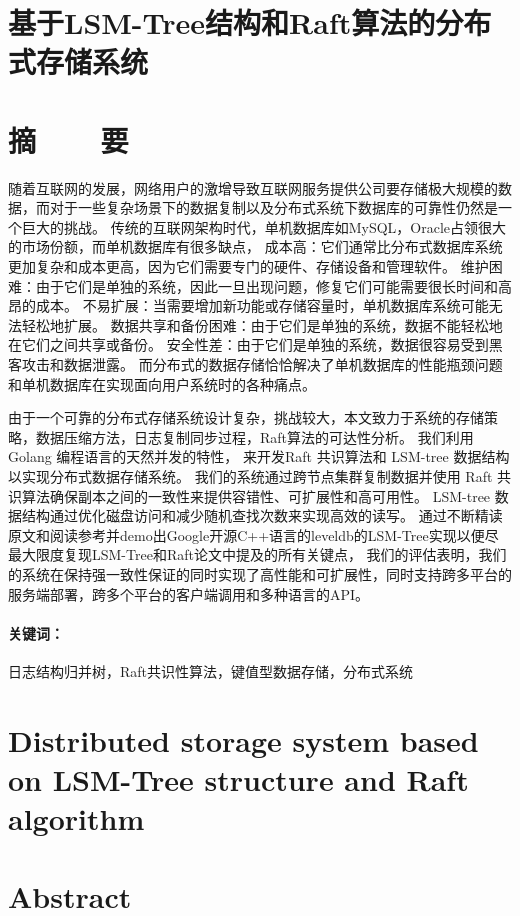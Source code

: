 \section*{基于LSM-Tree结构和Raft算法的分布式存储系统}
\section*{摘\ \ \ \ 要}

随着互联网的发展，网络用户的激增导致互联网服务提供公司要存储极大规模的数据，而对于一些复杂场景下的数据复制以及分布式系统下数据库的可靠性仍然是一个巨大的挑战。
传统的互联网架构时代，单机数据库如MySQL，Oracle占领很大的市场份额，而单机数据库有很多缺点，
成本高：它们通常比分布式数据库系统更加复杂和成本更高，因为它们需要专门的硬件、存储设备和管理软件。
维护困难：由于它们是单独的系统，因此一旦出现问题，修复它们可能需要很长时间和高昂的成本。
不易扩展：当需要增加新功能或存储容量时，单机数据库系统可能无法轻松地扩展。
数据共享和备份困难：由于它们是单独的系统，数据不能轻松地在它们之间共享或备份。
安全性差：由于它们是单独的系统，数据很容易受到黑客攻击和数据泄露。
而分布式的数据存储恰恰解决了单机数据库的性能瓶颈问题和单机数据库在实现面向用户系统时的各种痛点。


由于一个可靠的分布式存储系统设计复杂，挑战较大，本文致力于系统的存储策略，数据压缩方法，日志复制同步过程，Raft算法的可达性分析。
我们利用 Golang 编程语言的天然并发的特性， 来开发Raft 共识算法和 LSM-tree 数据结构以实现分布式数据存储系统。 
我们的系统通过跨节点集群复制数据并使用 Raft 共识算法确保副本之间的一致性来提供容错性、可扩展性和高可用性。 LSM-tree 数据结构通过优化磁盘访问和减少随机查找次数来实现高效的读写。 
通过不断精读原文和阅读参考并demo出Google开源C++语言的leveldb的LSM-Tree实现以便尽最大限度复现LSM-Tree和Raft论文中提及的所有关键点，
我们的评估表明，我们的系统在保持强一致性保证的同时实现了高性能和可扩展性，同时支持跨多平台的服务端部署，跨多个平台的客户端调用和多种语言的API。

\paragraph{关键词：} 日志结构归并树，Raft共识性算法，键值型数据存储，分布式系统

\clearpage


\section*{Distributed storage system based on LSM-Tree structure and Raft algorithm}

\section*{Abstract}

